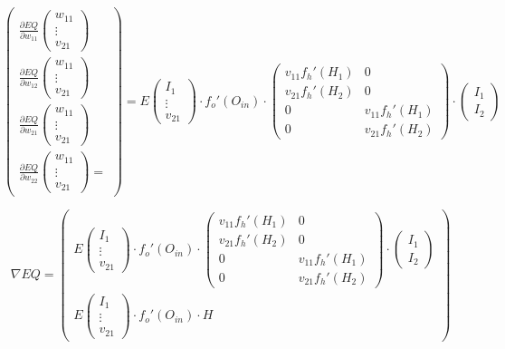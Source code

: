 \documentclass{article}
\begin{document}
$$
\begin{pmatrix}
\frac{\partial EQ}{\partial w_{11}}\begin{pmatrix}w_{11}\\\vdots\\v_{21}\end{pmatrix}\\\frac{\partial EQ}{\partial w_{12}}\begin{pmatrix}w_{11}\\\vdots\\v_{21}\end{pmatrix}
\\
 \frac{\partial EQ}{\partial w_{21}}\begin{pmatrix}w_{11}\\\vdots\\v_{21}\end{pmatrix} 
 \\
 \frac{\partial EQ}{\partial w_{22}}\begin{pmatrix}w_{11}\\\vdots\\v_{21}\end{pmatrix} =
\end{pmatrix} =  E\begin{pmatrix}I_{1}\\ \vdots \\v_{21} \end{pmatrix}\cdot f_o'(O_{in})\cdot
\begin{pmatrix}
v_{11} f_h'(H_1) & 0 \\ 
v_{21}f_h'(H_2) & 0 \\
0 & v_{11} f_h'(H_1)\\
0 & v_{21}f_h'(H_2)
\end{pmatrix} \cdot
\begin{pmatrix}
I_1 \\ I_2
\end{pmatrix}
$$

$$
\nabla EQ = 
\begin{pmatrix}  E\begin{pmatrix}I_{1}\\ \vdots \\v_{21} \end{pmatrix}\cdot f_o'(O_{in})\cdot
\begin{pmatrix}
v_{11} f_h'(H_1) & 0 \\ 
v_{21}f_h'(H_2) & 0 \\
0 & v_{11} f_h'(H_1)\\
0 & v_{21}f_h'(H_2)
\end{pmatrix} \cdot
\begin{pmatrix}
I_1 \\ I_2
\end{pmatrix}
\\
E\begin{pmatrix}I_{1}\\ \vdots \\v_{21} \end{pmatrix}\cdot f_o'(O_{in})\cdot H
\end{pmatrix}
$$
\end{document}
